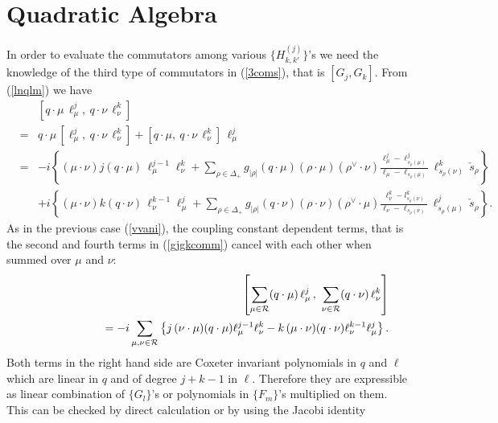 \documentclass[a4paper,12pt]{article}
\begin{document}
\section{Quadratic Algebra}
\label{quadal}
\setcounter{equation}{0}

In order to evaluate the commutators among various $\{H_{k,k'}^{(j)}\}$'s
we need the knowledge of the third type of commutators in (\ref{3coms}),
that
is $[G_j,G_k]$.
From (\ref{lnqlm}) we have
 \begin{eqnarray}
&&[q\cdot\mu \,\ell_\mu^j,\ q\cdot\nu \,\ell_\nu^k]\nonumber\\
      &=&
    q\cdot\mu\,[\ell_\mu^j,\ q\cdot\nu \, \ell_\nu^k] + [q\cdot\mu,\
q\cdot\nu\,
    \ell_\nu^k]\,\ell_\mu^j\nonumber\\
    &=& -i\left\{(\mu\cdot\nu) j (q\cdot\mu)\, \ell_\mu^{j-1}\ell_\nu^k
    +
\sum_{\rho\in\Delta_+}g_{|\rho|}(q\cdot\mu)(\rho\cdot\mu)
    (\rho^{\vee}\cdot\nu)
    \frac{\ell_\mu^j-\ell^j_{s_\rho(\mu)}}
    {\ell_\mu-\ell_{s_\rho(\mu)}}\,\ell^k_{s_\rho(\nu)} \,
       \check{s}_\rho  \right\}\nonumber\\
   & & +i\left\{(\mu\cdot\nu) k (q\cdot\nu)\, \ell_\nu^{k-1}\ell_\mu^j
   +
\sum_{\rho\in\Delta_+}g_{|\rho|}(q\cdot\nu)(\rho\cdot\nu)
(\rho^{\vee}\cdot\mu)
         \frac{\ell_\nu^k-l^k_{s_\rho(\nu)}}
{\ell_\nu-\ell_{s_\rho(\nu)}}\,\ell^j_{s_\rho(\mu)} \,
    \check{s}_\rho\right\}. \label{gjgkcomm}
\end{eqnarray}
As in the previous case (\ref{vvani}), the coupling constant dependent
terms, that is
the second and fourth terms in (\ref{gjgkcomm}) cancel with each other
when summed over $\mu$ and $\nu$:
\begin{eqnarray}
   &&\left[\sum_{\mu\in{\mathcal R}}(q\cdot\mu)\,\ell_\mu^j\, ,\
       \sum_{\nu\in{\mathcal R}}
           (q\cdot\nu)\,\ell_\nu^k\right]\nonumber\\
   &&\hspace*{2cm}  = -i\sum_{\mu,\nu\in{\mathcal R}}
   \left\{j\, (\nu\cdot\mu) (q\cdot\mu)
   \ell_\mu^{j-1}\ell_\nu^{k}- k\, (\mu\cdot\nu)  (q\cdot\nu)
   \ell_\nu^{k-1}\ell_\mu^{j}\right\}.
\label{gjgkcomm2}
\end{eqnarray}
Both terms in the right hand side are Coxeter invariant polynomials
in $q$ and $\ell$ which are linear in $q$ and of degree $j+k-1$ in $\ell$.
Therefore they are expressible as linear combination of
$\{G_l\}$'s or polynomials in $\{F_m\}$'s multiplied on them.
This can be checked by direct calculation or by using the Jacobi identity
\end{document}
